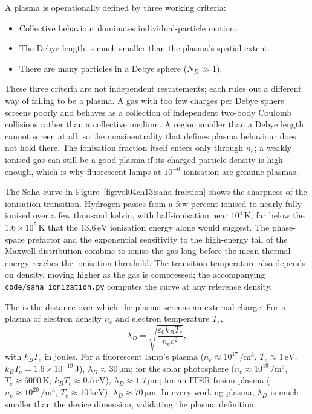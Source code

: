 A plasma is operationally defined by three working criteria:
\begin{itemize}[leftmargin=*]
  \item Collective behaviour dominates individual-particle motion.
  \item The Debye length is much smaller than the plasma's spatial
    extent.
  \item There are many particles in a Debye sphere ($N_{D} \gg 1$).
\end{itemize}
These three criteria are not independent restatements; each rules out a
different way of failing to be a plasma. A gas with too few charges per
Debye sphere screens poorly and behaves as a collection of independent
two-body Coulomb collisions rather than a collective medium. A region
smaller than a Debye length cannot screen at all, so the quasineutrality
that defines plasma behaviour does not hold there. The ionisation fraction
itself enters only through $n_{e}$; a weakly ionised gas can still be a
good plasma if its charged-particle density is high enough, which is why
fluorescent lamps at $10^{-6}$ ionisation are genuine plasmas.



The Saha curve in Figure~\ref{fig:vol04ch13:saha-fraction} shows the
sharpness of the ionisation transition. Hydrogen passes from a few percent
ionised to nearly fully ionised over a few thousand kelvin, with
half-ionisation near $10^{4}\,\si{\kelvin}$, far below the $1.6\times
10^{5}\,\si{\kelvin}$ that the $13.6\,\si{\electronvolt}$ ionisation energy
alone would suggest. The phase-space prefactor and the exponential
sensitivity to the high-energy tail of the Maxwell distribution combine to
ionise the gas long before the mean thermal energy reaches the ionisation
threshold. The transition temperature also depends on density, moving
higher as the gas is compressed; the accompanying
\texttt{code/saha\_ionization.py} computes the curve at any reference
density.

The  is the distance over which the plasma
screens an external charge. For a plasma of electron density $n_{e}$
and electron temperature $T_{e}$,
\[
\lambda_{D} = \sqrt{\frac{\varepsilon_{0}k_{B}T_{e}}{n_{e}e^{2}}},
\]
with $k_{B}T_{e}$ in joules. For a fluorescent lamp's plasma
($n_{e}\approx 10^{17}\,\si{\per\meter\cubed}$, $T_{e}\approx 1\,\si{
\electronvolt}$, $k_{B}T_{e} = 1.6\times 10^{-19}\,\si{\joule}$),
$\lambda_{D}\approx 30\,\si{\micro\meter}$; for the solar
photosphere ($n_{e}\approx 10^{19}\,\si{\per\meter\cubed}$,
$T_{e}\approx 6000\,\si{\kelvin}$, $k_{B}T_{e}\approx 0.5\,\si{
\electronvolt}$), $\lambda_{D}\approx 1.7\,\si{\micro\meter}$; for an
ITER fusion plasma ($n_{e}\approx 10^{20}\,\si{\per\meter\cubed}$,
$T_{e}\approx 10\,\si{\kilo\electronvolt}$), $\lambda_{D}\approx
70\,\si{\micro\meter}$. In every working plasma, $\lambda_{D}$ is
much smaller than the device dimension, validating the plasma
definition.

